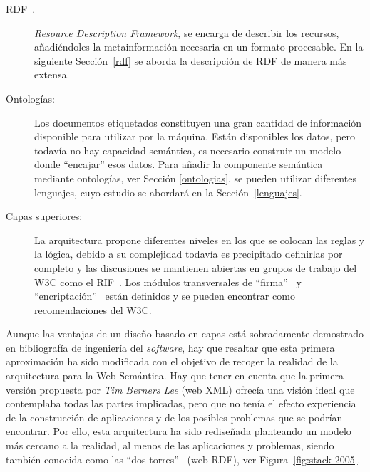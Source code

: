 \begin{description}
\item[\gls{RDF}~\cite{RDF}.] \textit{Resource Description Framework}, se encarga
de describir los recursos, añadiéndoles la metainformación necesaria en
un formato procesable. En la siguiente Sección~\ref{rdf} se aborda la descripción de
RDF de manera más extensa.

\item[Ontologías:] Los documentos etiquetados constituyen una gran cantidad
de información disponible para utilizar por la máquina. Están disponibles los datos, pero
todavía no hay capacidad semántica, es necesario construir un modelo donde ``encajar''
esos datos. Para añadir la componente semántica mediante ontologías, ver Sección
\ref{ontologias}, se pueden utilizar diferentes lenguajes, cuyo estudio se 
abordará en la Sección~\ref{lenguajes}.

\item[Capas superiores:] La arquitectura propone diferentes niveles en los
que se colocan las reglas y la lógica, debido a su complejidad todavía es precipitado definirlas por completo y las discusiones se mantienen
abiertas en grupos de trabajo del \gls{W3C} como el \gls{RIF}~\cite{rif-core}. 
Los módulos transversales de ``firma''~\cite{XML-dsig} y 
``encriptación''~\cite{XML-enc} están definidos y se
pueden encontrar como recomendaciones del W3C.

\end{description}

Aunque las ventajas de un diseño basado en capas está sobradamente demostrado en
bibliografía de ingeniería del \textit{software}, hay que resaltar que esta primera
aproximación ha sido modificada con el objetivo de recoger la realidad de la
arquitectura para la Web Semántica. Hay que tener en cuenta que la primera
versión propuesta por \textit{Tim Berners Lee} (web XML) ofrecía una visión ideal
que contemplaba todas las partes implicadas, pero que no tenía el efecto experiencia
de la construcción de aplicaciones y de los posibles problemas que se podrían
encontrar. Por ello, esta arquitectura ha sido rediseñada planteando un modelo
más cercano a la realidad, al menos de las aplicaciones y problemas, siendo también 
conocida como las ``dos torres''~\cite{kifer05} (web RDF), ver Figura~\ref{fig:stack-2005}.


